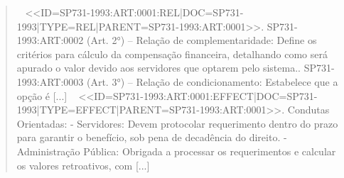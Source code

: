 \documentclass{IOS-Book-Article}
\begin{document}
\begin{quote}
~\newline
<<ID=SP731-1993:ART:0001:REL|\allowbreak{}DOC=SP731-1993|\allowbreak{}TYPE=REL|\allowbreak{}PARENT=SP731-1993:ART:0001>>. SP731-1993:ART:0002 (Art. 2°) -- Relação de complementaridade: Define os critérios para cálculo da compensação financeira, detalhando como será apurado o valor devido aos servidores que optarem pelo sistema.. SP731-1993:ART:0003 (Art. 3°) -- Relação de condicionamento: Estabelece que a opção é [...]\newline
~\newline
<<ID=SP731-1993:ART:0001:EFFECT|\allowbreak{}DOC=SP731-1993|\allowbreak{}TYPE=EFFECT|\allowbreak{}PARENT=SP731-1993:ART:0001>>. Condutas Orientadas:\newline
 - Servidores: Devem protocolar requerimento dentro do prazo para garantir o benefício, sob pena de decadência do direito.\newline
 - Administração Pública: Obrigada a processar os requerimentos e calcular os valores retroativos, com [...]
\end{quote}
\end{document}
